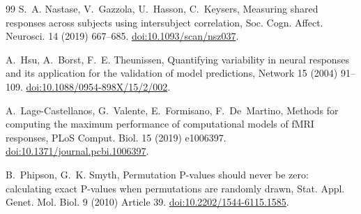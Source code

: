 \documentclass[preprint,12pt]{elsarticle}
\begin{document}
\begin{thebibliography}{99}
S.~A. Nastase, V.~Gazzola, U.~Hasson, C.~Keysers, Measuring shared responses across subjects
using intersubject correlation, Soc. Cogn. Affect. Neurosci. 14 (2019) 667--685.
\href{https://doi.org/10.1093/scan/nsz037}{doi:10.1093/scan/nsz037}.

A.~Hsu, A.~Borst, F.~E. Theunissen, Quantifying variability in neural responses and its
application for the validation of model predictions, Network 15 (2004) 91--109.
\href{https://doi.org/10.1088/0954-898X/15/2/002}{doi:10.1088/0954-898X/15/2/002}.

A.~Lage-Castellanos, G.~Valente, E.~Formisano, F.~De~Martino, Methods for computing the
maximum performance of computational models of fMRI responses, PLoS Comput. Biol. 15 (2019)
e1006397. \href{https://doi.org/10.1371/journal.pcbi.1006397}{doi:10.1371/journal.pcbi.1006397}.

B.~Phipson, G.~K. Smyth, Permutation P-values should never be zero: calculating exact
P-values when permutations are randomly drawn, Stat. Appl. Genet. Mol. Biol. 9 (2010)
Article 39. \href{https://doi.org/10.2202/1544-6115.1585}{doi:10.2202/1544-6115.1585}.

\end{thebibliography}
\end{document}

